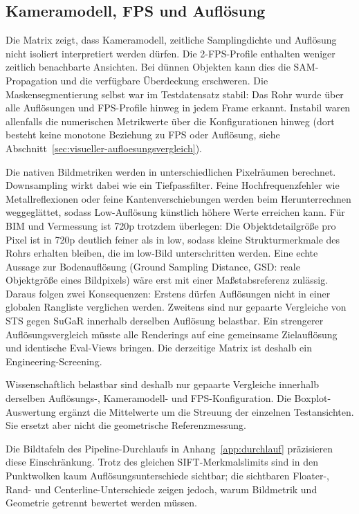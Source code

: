 \subsection{Kameramodell, FPS und Auflösung}

Die Matrix zeigt, dass Kameramodell, zeitliche Samplingdichte und Auflösung
nicht isoliert interpretiert werden dürfen. Die 2-FPS-Profile enthalten weniger
zeitlich benachbarte Ansichten. Bei dünnen Objekten kann dies die SAM-
Propagation und die verfügbare Überdeckung erschweren. Die Maskensegmentierung
selbst war im Testdatensatz stabil: Das Rohr wurde über alle Auflösungen und
FPS-Profile hinweg in jedem Frame erkannt. Instabil waren allenfalls die
numerischen Metrikwerte über die Konfigurationen hinweg (dort besteht keine
monotone Beziehung zu FPS oder Auflösung, siehe
Abschnitt~\ref{sec:visueller-aufloesungsvergleich}).

Die nativen Bildmetriken werden in unterschiedlichen Pixelräumen berechnet.
Downsampling wirkt dabei wie ein Tiefpassfilter. Feine Hochfrequenzfehler wie
Metallreflexionen oder feine Kantenverschiebungen werden beim Herunterrechnen
weggeglättet, sodass Low-Auflösung künstlich höhere Werte erreichen kann. Für
BIM und Vermessung ist 720p trotzdem überlegen: Die Objektdetailgröße pro
Pixel ist in 720p deutlich feiner als in low, sodass kleine Strukturmerkmale
des Rohrs erhalten bleiben, die im low-Bild unterschritten werden. Eine echte
Aussage zur Bodenauflösung (Ground Sampling Distance, GSD: reale Objektgröße
eines Bildpixels) wäre erst mit einer Maßstabsreferenz zulässig. Daraus folgen
zwei Konsequenzen: Erstens dürfen Auflösungen nicht in einer globalen Rangliste
verglichen werden. Zweitens sind nur gepaarte Vergleiche von STS gegen SuGaR
innerhalb derselben Auflösung belastbar. Ein strengerer
Auflösungsvergleich müsste alle Renderings auf eine gemeinsame Zielauflösung
und identische Eval-Views bringen. Die derzeitige Matrix ist deshalb ein
Engineering-Screening.

Wissenschaftlich belastbar sind deshalb nur gepaarte Vergleiche innerhalb
derselben Auflösungs-, Kameramodell- und FPS-Konfiguration. Die Boxplot-
Auswertung ergänzt die Mittelwerte um die Streuung der einzelnen Testansichten.
Sie ersetzt aber nicht die geometrische Referenzmessung.

Die Bildtafeln des Pipeline-Durchlaufs in
Anhang~\ref{app:durchlauf} präzisieren diese Einschränkung. Trotz des gleichen
SIFT-Merkmalslimits sind in den Punktwolken kaum Auflösungsunterschiede
sichtbar; die sichtbaren Floater-, Rand- und Centerline-Unterschiede zeigen
jedoch, warum Bildmetrik und Geometrie getrennt bewertet werden müssen.

